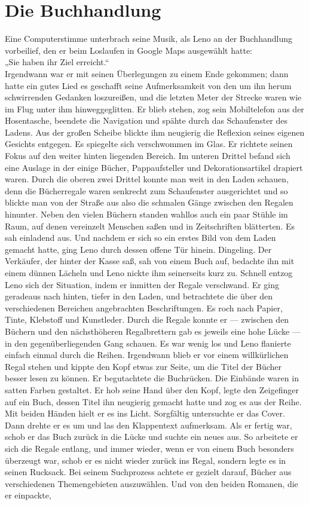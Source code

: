 \documentclass[ngerman,smalldemyvopaper,11pt,oneside,onecolumn,openright,extrafontsizes]{memoir}
\begin{document}
\chapter{Die Buchhandlung}
Eine Computerstimme unterbrach seine Musik, als Leno an der Buchhandlung vorbeilief, den er beim Loslaufen in Google Maps ausgewählt hatte:
\vspace{0.5em} \\
„Sie haben ihr Ziel erreicht.“
\vspace{0.5em} \\
Irgendwann war er mit seinen Überlegungen zu einem Ende gekommen; dann hatte ein gutes Lied es geschafft seine Aufmerksamkeit von den um ihn herum schwirrenden Gedanken loszureißen, und die letzten Meter der Strecke waren wie im Flug unter ihm hinweggeglitten. Er blieb stehen, zog sein Mobiltelefon aus der Hosentasche, beendete die Navigation und spähte durch das Schaufenster des Ladens. Aus der großen Scheibe blickte ihm neugierig die Reflexion seines eigenen Gesichts entgegen. Es spiegelte sich verschwommen im Glas. Er richtete seinen Fokus auf den weiter hinten liegenden Bereich. Im unteren Drittel befand sich eine Auslage in der einige Bücher, Pappaufsteller und Dekorationsartikel drapiert waren. Durch die oberen zwei Drittel konnte man weit in den Laden schauen, denn die Bücherregale waren senkrecht zum Schaufenster ausgerichtet und so blickte man von der Straße aus also die schmalen Gänge zwischen den Regalen hinunter. Neben den vielen Büchern standen wahllos auch ein paar Stühle im Raum, auf denen vereinzelt Menschen saßen und in Zeitschriften blätterten. Es sah einladend aus. Und nachdem er sich so ein erstes Bild von dem Laden gemacht hatte, ging Leno durch dessen offene Tür hinein. Dingeling. Der Verkäufer, der hinter der Kasse saß, sah von einem Buch auf, bedachte ihn mit einem dünnen Lächeln und Leno nickte ihm seinerseits kurz zu. Schnell entzog Leno sich der Situation, indem er inmitten der Regale verschwand. Er ging geradeaus nach hinten, tiefer in den Laden, und betrachtete die über den verschiedenen Bereichen angebrachten Beschriftungen. Es roch nach Papier, Tinte, Klebstoff und Kunstleder. Durch die Regale konnte er — zwischen den Büchern und den nächsthöheren Regalbrettern gab es jeweils eine hohe Lücke — in den gegenüberliegenden Gang schauen. Es war wenig los und Leno flanierte einfach einmal durch die Reihen. Irgendwann blieb er vor einem willkürlichen Regal stehen und kippte den Kopf etwas zur Seite, um die Titel der Bücher besser lesen zu können. Er begutachtete die Buchrücken. Die Einbände waren in satten Farben gestaltet. Er hob seine Hand über den Kopf, legte den Zeigefinger auf ein Buch, dessen Titel ihn neugierig gemacht hatte und zog es aus der Reihe. Mit beiden Händen hielt er es ins Licht. Sorgfältig untersuchte er das Cover. Dann drehte er es um und las den Klappentext aufmerksam. Als er fertig war, schob er das Buch zurück in die Lücke und suchte ein neues aus. So arbeitete er sich die Regale entlang, und immer wieder, wenn er von einem Buch besonders überzeugt war, schob er es nicht wieder zurück ins Regal, sondern legte es in seinen Rucksack. Bei seinem Suchprozess achtete er gezielt darauf, Bücher aus verschiedenen Themengebieten auszuwählen. Und von den beiden Romanen, die er einpackte, 
\end{document}
